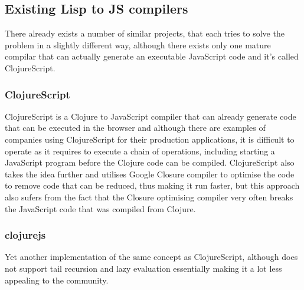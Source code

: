 \subsection{Existing Lisp to JS compilers}
There already exists a number of similar projects, that each tries to solve the problem in a slightly different way, although there exists only one mature compilar that can actually generate an executable JavaScript code and it's called ClojureScript.

\subsubsection{ClojureScript}
ClojureScript is a Clojure to JavaScript compiler that can already generate code that can be executed in the browser and although there are examples of companies using ClojureScript for their production applications, it is difficult to operate as it requires to execute a chain of operations, including starting a JavaScript program before the Clojure code can be compiled.
ClojureScript also takes the idea further and utilises Google Closure compiler to optimise the code to remove code that can be reduced, thus making it run faster, but this approach also sufers from the fact that the Closure optimising compiler very often breaks the JavaScript code that was compiled from Clojure.

\subsubsection{clojurejs}
Yet another implementation of the same concept as ClojureScript, although does not support tail recursion and lazy evaluation essentially making it a lot less appealing to the community.
